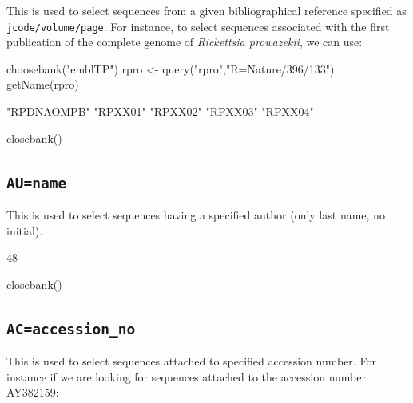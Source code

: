 \documentclass{article}
\begin{document}
This is used to select sequences from a given bibliographical reference specified
as \texttt{jcode/volume/page}. For instance, to select sequences associated
with the first publication \cite{jrl0009} of the complete genome of \textit{Rickettsia prowazekii},
we can use:

\begin{Schunk}
\begin{Sinput}
 choosebank("emblTP")
 rpro <- query("rpro","R=Nature/396/133")
 getName(rpro)
\end{Sinput}
\begin{Soutput}
[1] "RPDNAOMPB" "RPXX01"    "RPXX02"    "RPXX03"    "RPXX04"   
\end{Soutput}
\begin{Sinput}
 closebank()
\end{Sinput}
\end{Schunk}

\subsection{\texttt{AU=name}}

This is used to select sequences having a specified author (only last name, no initial).

\begin{Schunk}
\begin{Soutput}
[1] 48
\end{Soutput}
\begin{Sinput}
 closebank()
\end{Sinput}
\end{Schunk}

\subsection{\texttt{AC=accession\_no}}

This is used to select sequences attached to specified accession number.
For instance if we are looking for sequences attached to the accession
number AY382159:
\end{document}
